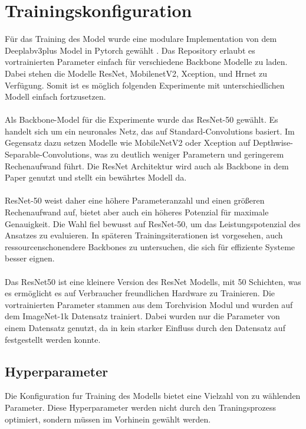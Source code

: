 \documentclass[12pt,DIV=15,BCOR=15mm,twoside,headsepline,abstract=true,listof=totoc,bibliography=totoc]{scrreprt}
\theoremstyle{remark}    %
\begin{document}
    \section{Trainingskonfiguration}
    Für das Training des Model wurde eine modulare Implementation von dem Deeplabv3plus Model in Pytorch gewählt \cite{Deeplabv3plus_PyTorch}. Das Repository erlaubt
    es vortrainierten Parameter einfach für verschiedene Backbone Modelle zu laden. Dabei stehen die Modelle ResNet, MobilenetV2, Xception, und Hrnet zu Verfügung.
    Somit ist es möglich folgenden Experimente mit unterschiedlichen Modell einfach fortzusetzen.\\\\
    Als Backbone-Model für die Experimente wurde das ResNet-50 gewählt. Es handelt sich um ein neuronales Netz, das auf Standard-Convolutions basiert.
    Im Gegensatz dazu setzen Modelle wie MobileNetV2 oder Xception auf Depthwise-Separable-Convolutions, was zu deutlich weniger Parametern und geringerem 
    Rechenaufwand führt. Die ResNet Architektur wird auch als Backbone in dem Paper \cite{chen2017rethinkingatrousconvolutionsemantic,HaitzHuebnerUlrich2022} 
    genutzt und stellt ein bewährtes Modell da.\\\\
    ResNet-50 weist daher eine höhere Parameteranzahl und einen größeren Rechenaufwand auf, bietet aber auch ein höheres Potenzial für 
    maximale Genauigkeit. Die Wahl fiel bewusst auf ResNet-50, um das Leistungspotenzial des Ansatzes zu evaluieren. In späteren Trainingsiterationen ist vorgesehen, 
    auch ressourcenschonendere Backbones zu untersuchen, die sich für effiziente Systeme besser eignen.\\\\
    Das ResNet50 ist eine kleinere Version des ResNet Modells, mit 50 Schichten, was es ermöglicht es auf Verbraucher freundlichen Hardware zu Trainieren. Die 
    vortrainierten Parameter stammen aus dem Torchvision Modul und wurden auf dem ImageNet-1k Datensatz \cite{deng2009imagenet} trainiert.
    Dabei wurden nur die Parameter von einem Datensatz genutzt, da in \cite{HaitzHuebnerUlrich2022} kein starker Einfluss durch den Datensatz auf festgestellt werden
    konnte.

    \subsection{Hyperparameter}
    Die Konfiguration fur Training des Modells bietet eine Vielzahl von zu wählenden Parameter. Diese  Hyperparameter werden nicht durch den Traningsprozess optimiert,
    sondern müssen im Vorhinein gewählt werden.
\end{document}
